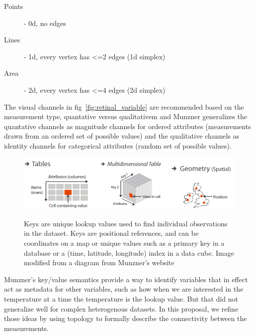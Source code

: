 \documentclass[letterpaper,onecolumn,titlepage]{Ythesis}
\begin{document}
\begin{description} 
    \item[Points] - 0d, no edges
    \item[Lines] - 1d, every vertex has <=2 edges (1d simplex)
    \item[Area] - 2d,  every vertex has <=4 edges (2d simplex)
\end{description}

The visual channels in fig~\ref{fig:retinal_variable} are recommended based on the measurement type, quantative versus qualitativem  and Munzner generalizes the quantative channels as magnitude channels for ordered attributes (measurements drawn from an ordered set of possible values) and the qualitative channels as identity channels for categorical attributes (random set of possible values). 


\begin{figure}
    \includegraphics{figures/intro/munzner_datatypes}
    \label{fig:munzner_datatypes}
    \caption{Keys are unique lookup values used to find individual observations in the dataset. Keys are positional references, and can be coordinates on a map or unique values such as a primary key in a database or a (time, latitude, longitude) index in a data cube. Image modified from a diagram from Munzner's website\cite{munznerChDataAbstraction}}
\end{figure}
Munzner's key/value semantics\cite{munznerWhatDataAbstraction2014}
provide a way to identify variables that in effect act as metadata for other variables, such as how when we are interested in the temperature at a time the temperature is the lookup value. But that did not generalize well for complex heterogenous datasets. In this proposal, we refine those ideas by using topology to formally describe the connectivity between the measurements. 
\end{document}
